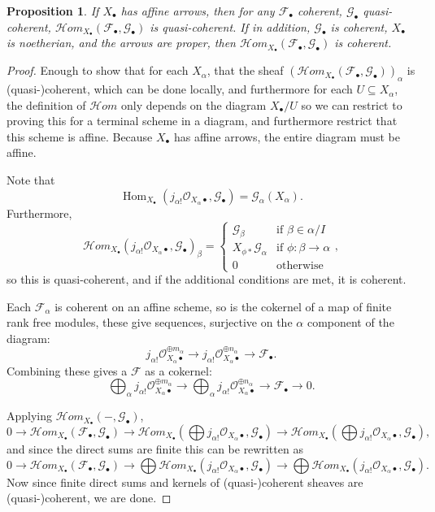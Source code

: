\documentclass{report}
\newtheorem{prop}[theorem]{Proposition}
\theoremstyle{definition}
\DeclareMathOperator{\Hom}{Hom}
\newcommand{\cHom}{\mathcal{H} \textit{om}}
\newcommand{\FF}{\mathscr{F}}
\newcommand{\GG}{\mathscr{G}}
\newcommand{\OO}{\mathcal{O}}
\begin{document}
\begin{prop}
	\label{prp:homqcaffine}
	If $X_\bullet$ has affine arrows, then for any $\FF_\bullet$ coherent, $\GG_\bullet$ quasi-coherent, $\cHom_{X_\bullet}(\FF_\bullet, \GG_\bullet)$ is quasi-coherent.
	If in addition, $\GG_\bullet$ is coherent, $X_\bullet$ is noetherian, and the arrows are proper, then $\cHom_{X_\bullet}(\FF_\bullet, \GG_\bullet)$ is coherent.
\end{prop}
\begin{proof}
	Enough to show that for each $X_\alpha$, that the sheaf $(\cHom_{X_\bullet}(\FF_\bullet, \GG_\bullet))_\alpha$ is (quasi-)coherent, which can be done locally, and furthermore for each $U \subseteq X_\alpha$, the definition of $\cHom$ only depends on the diagram $X_\bullet / U$ so we can restrict to proving this for a terminal scheme in a diagram, and furthermore restrict that this scheme is affine.
	Because $X_\bullet$ has affine arrows, the entire diagram must be affine.
		
	Note that
	\[
		\Hom_{X_\bullet}(j_{\alpha !} \OO_{X_\alpha \bullet}, \GG_\bullet) = \GG_\alpha(X_\alpha).
	\]
	Furthermore,
	\[
		\cHom_{X_\bullet}(j_{\alpha !} \OO_{X_\alpha \bullet}, \GG_\bullet)_\beta = \begin{cases}
													\GG_\beta  & \text{if } \beta \in \alpha / I \\
													X_{\phi *} \GG_\alpha & \text{if } \phi : \beta \rightarrow \alpha \\
													0 & \text{otherwise}
													\end{cases},
	\]
	so this is quasi-coherent, and if the additional conditions are met, it is coherent.
	
	Each $\FF_\alpha$ is coherent on an affine scheme, so is the cokernel of a map of finite rank free modules, these give sequences, surjective on the $\alpha$ component of the diagram:
	\[
		j_{\alpha !}\OO_{X_\alpha \bullet}^{\oplus m_\alpha} \rightarrow j_{\alpha !}\OO_{X_\alpha \bullet}^{\oplus n_\alpha} \rightarrow \FF_\bullet.
	\]
	Combining these gives a $\FF$ as a cokernel:
	\[
		\bigoplus_\alpha j_{\alpha !}\OO_{X_\alpha \bullet}^{\oplus m_\alpha} \rightarrow \bigoplus_\alpha j_{\alpha !}\OO_{X_\alpha \bullet}^{ \oplus n_\alpha} \rightarrow \FF_\bullet \rightarrow 0.
	\]
	
	Applying $\cHom_{X_\bullet}(-,\GG_\bullet)$,
	\[
		0 \rightarrow \cHom_{X_\bullet}(\FF_\bullet, \GG_\bullet) \rightarrow \cHom_{X_\bullet}(\bigoplus j_{\alpha !}\OO_{X_\alpha \bullet}, \GG_\bullet) \rightarrow \cHom_{X_\bullet}(\bigoplus j_{\alpha !}\OO_{X_\alpha \bullet}, \GG_\bullet),
	\]
	and since the direct sums are finite this can be rewritten as
	\[
		0 \rightarrow \cHom_{X_\bullet}(\FF_\bullet, \GG_\bullet) \rightarrow \bigoplus \cHom_{X_\bullet}(j_{\alpha !}\OO_{X_\alpha \bullet}, \GG_\bullet) \rightarrow \bigoplus \cHom_{X_\bullet}(j_{\alpha !}\OO_{X_\alpha \bullet}, \GG_\bullet).
	\]
	Now since finite direct sums and kernels of (quasi-)coherent sheaves are (quasi-)coherent, we are done.
\end{proof}
\end{document}
